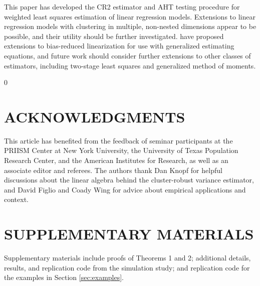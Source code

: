 \documentclass[12pt]{article}\usepackage[]{graphicx}\usepackage[]{color}
\newcommand{\blind}{0}
\begin{document}
This paper has developed the CR2 estimator and AHT testing procedure for weighted least squares estimation of linear regression models. 
Extensions to linear regression models with clustering in multiple, non-nested dimensions \citep[cf.][]{Cameron2011robust} appear to be possible, and their utility should be further investigated. 
\citet{McCaffrey2006improved} have proposed extensions to bias-reduced linearization for use with generalized estimating equations, and future work should consider further extensions to other classes of estimators, including two-stage least squares and generalized method of moments. 

\blind
{
\section*{ACKNOWLEDGMENTS}

This article has benefited from the feedback of seminar participants at the PRIISM Center at New York University, the University of Texas Population Research Center, and the American Institutes for Research, as well as an associate editor and referees. The authors thank Dan Knopf for helpful discussions about the linear algebra behind the cluster-robust variance estimator, and David Figlio and Coady Wing for advice about empirical applications and context.
} \fi

\section*{SUPPLEMENTARY MATERIALS}

Supplementary materials include proofs of Theorems 1 and 2; additional details, results, and replication code from the simulation study; and replication code for the examples in Section \ref{sec:examples}.



\end{document}
